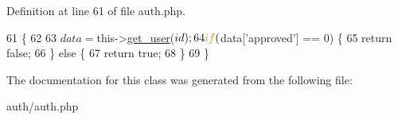 Definition at line 61 of file auth.\-php.


\begin{DoxyCode}
61                                          \{
62 
63         $data = $this->\hyperlink{classauth_aebf5c1995f3314883dc475628db61ccc}{get\_user}($id);
64         \textcolor{keywordflow}{if} ($data[\textcolor{stringliteral}{'approved'}] == 0) \{
65             \textcolor{keywordflow}{return} \textcolor{keyword}{false};
66         \} \textcolor{keywordflow}{else} \{
67             \textcolor{keywordflow}{return} \textcolor{keyword}{true};
68         \}
69     \}
\end{DoxyCode}


The documentation for this class was generated from the following file\-:\begin{DoxyCompactItemize}
\item 
auth/auth.\-php\end{DoxyCompactItemize}
